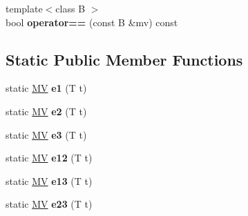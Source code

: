 \begin{DoxyCompactItemize}
\item 
\hypertarget{classvsr_1_1_m_v_a06e99d1983dca258987910a20acf2fe5}{{\footnotesize template$<$class B $>$ }\\bool {\bfseries operator==} (const B \&mv) const }\label{classvsr_1_1_m_v_a06e99d1983dca258987910a20acf2fe5}

\end{DoxyCompactItemize}
\subsection*{Static Public Member Functions}
\begin{DoxyCompactItemize}
\item 
\hypertarget{classvsr_1_1_m_v_a31683cc43e2df2eb4de1137ca5a76396}{static \hyperlink{classvsr_1_1_m_v}{M\-V} {\bfseries e1} (T t)}\label{classvsr_1_1_m_v_a31683cc43e2df2eb4de1137ca5a76396}

\item 
\hypertarget{classvsr_1_1_m_v_a90eceb4f8deecb4fe1710fb83f44b1e6}{static \hyperlink{classvsr_1_1_m_v}{M\-V} {\bfseries e2} (T t)}\label{classvsr_1_1_m_v_a90eceb4f8deecb4fe1710fb83f44b1e6}

\item 
\hypertarget{classvsr_1_1_m_v_a3cb9e73eaac2854d76361fc00aa8e757}{static \hyperlink{classvsr_1_1_m_v}{M\-V} {\bfseries e3} (T t)}\label{classvsr_1_1_m_v_a3cb9e73eaac2854d76361fc00aa8e757}

\item 
\hypertarget{classvsr_1_1_m_v_a5cdc295845fc9b1c9ebad3bb518b0489}{static \hyperlink{classvsr_1_1_m_v}{M\-V} {\bfseries e12} (T t)}\label{classvsr_1_1_m_v_a5cdc295845fc9b1c9ebad3bb518b0489}

\item 
\hypertarget{classvsr_1_1_m_v_a20d0e19f0e431a532ba82b6047b535c0}{static \hyperlink{classvsr_1_1_m_v}{M\-V} {\bfseries e13} (T t)}\label{classvsr_1_1_m_v_a20d0e19f0e431a532ba82b6047b535c0}

\item 
\hypertarget{classvsr_1_1_m_v_a48243cc0a7f081e9d7f38d12f9746169}{static \hyperlink{classvsr_1_1_m_v}{M\-V} {\bfseries e23} (T t)}\label{classvsr_1_1_m_v_a48243cc0a7f081e9d7f38d12f9746169}

\end{DoxyCompactItemize}
